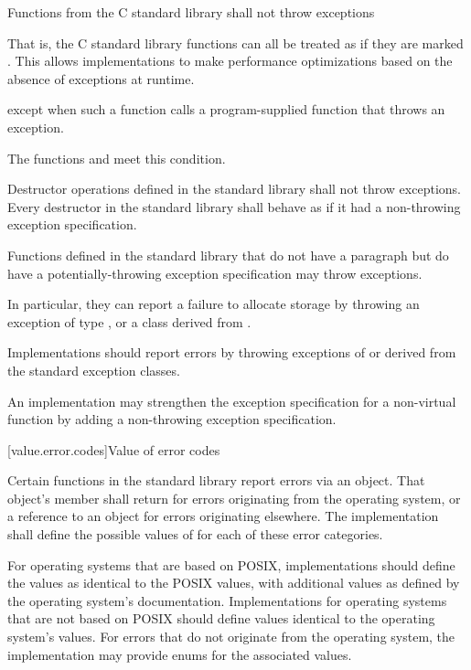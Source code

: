 \pnum
Functions from the C standard library shall not throw exceptions%
%
\begin{footnote}
That is, the C standard library functions can all be treated as if they
are marked .
This allows implementations to make performance optimizations
based on the absence of exceptions at runtime.
\end{footnote}
except when such a function calls a program-supplied function that throws an
exception.
\begin{footnote}
The functions
and
 meet this condition.
\end{footnote}

\pnum
Destructor operations defined in the \Cpp{} standard library
shall not throw exceptions.
Every destructor in the \Cpp{} standard library shall behave as if it had a
non-throwing exception specification.

\pnum
Functions defined in the
\Cpp{} standard library
%
that do not have a \throws paragraph
but do have a potentially-throwing exception specification
may throw  exceptions.
\begin{footnote}
In particular, they
can report a failure to allocate storage by throwing an exception of type
,
or a class derived from
.
\end{footnote}
Implementations should
report errors by throwing exceptions of or derived
from the standard
exception classes.

\pnum
An implementation may strengthen the
exception specification
for a non-virtual function
by adding a non-throwing exception specification.

[value.error.codes]{Value of error codes}

\pnum
Certain functions in the \Cpp{} standard library report errors via an
 object. That object's
 member shall return  for
errors originating from the operating system, or a reference to an
  object for errors originating elsewhere.
The implementation shall define the possible values of  for each of these
error categories.
\begin{example}
For operating systems that are based on POSIX,
implementations should define the  values as
identical to the POSIX  values, with additional values as defined by the
operating system's documentation. Implementations for operating systems that are not
based on POSIX should define values identical to the operating system's
values. For errors that do not originate from the operating system, the implementation
may provide enums for the associated values.
\end{example}

